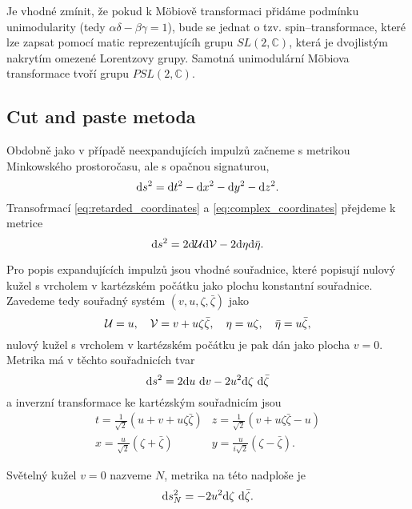 Je vhodné zmínit, že pokud k Möbiově transformaci přidáme podmínku unimodularity (tedy $\alpha \delta - \beta \gamma = 1$),
bude se jednat o tzv. spin--transformace, které lze zapsat pomocí matic reprezentujícíh grupu $SL(2,\mathbb{C})$, která je dvojlistým nakrytím
omezené Lorentzovy grupy. Samotná unimodulární Möbiova transformace tvoří grupu $PSL(2, \mathbb{C})$.

\subsection{Cut and paste metoda}
Obdobně jako v případě neexpandujících impulzů začneme s metrikou Minkowského prostoročasu, ale s opačnou signaturou,
\begin{equation}
    \mathrm{d} s^2 = \mathrm{d} t^2 - \mathrm{d} x^2 - \mathrm{d} y^2 - \mathrm{d} z^2.
\end{equation}
Transofrmací \eqref{eq:retarded_coordinates} a \eqref{eq:complex_coordinates} přejdeme
k metrice
\begin{equation}
    \mathrm{d} s^2 = 2 \mathrm{d} \mathcal{U} \mathrm{d} \mathcal{V} - 2 \mathrm{d} \eta \mathrm{d} \bar{\eta}.
\end{equation}

Pro popis expandujících impulzů jsou vhodné souřadnice, které popisují nulový kužel s
vrcholem v kartézském počátku jako plochu konstantní souřadnice. Zavedeme tedy
souřadný systém $(v, u, \zeta, \bar{\zeta})$ jako
\begin{equation}
    \label{eq:expanding_null_tetrad}
    \mathcal{U} = u,~~~ \mathcal{V} = v + u \zeta \bar{\zeta}, ~~~ \eta = u \zeta, ~~~ \bar{\eta} = u \bar{\zeta},
\end{equation}
nulový kužel s vrcholem v kartézském počátku je pak dán jako plocha $v=0$. Metrika má v těchto souřadnicích tvar
\begin{equation}
    \mathrm{d} s^2 = 2 \mathrm{d} u ~ \mathrm{d} v - 2 u^2 \mathrm{d} \zeta ~ \mathrm{d} \bar{\zeta}
\end{equation}
a inverzní transformace ke kartézským souřadnicím jsou
\begin{align}
    t = \frac{1}{\sqrt{2}} \left(u + v + u \zeta \bar{\zeta}\right) & z = \frac{1}{\sqrt{2}} \left(v + u \zeta \bar{\zeta} - u\right) \\
    x = \frac{u}{\sqrt{2}} (\zeta + \bar{\zeta}) & y = \frac{u}{i \sqrt{2}} (\zeta - \bar{\zeta}).
\end{align}

Světelný kužel $v=0$ nazveme $N$, metrika na této nadploše je
\begin{equation}
    \label{eq:null_cone_metric}
    \mathrm{d} s_N^2 = -2 u^2 \mathrm{d} \zeta ~ \mathrm{d} \bar{\zeta}.
\end{equation}

